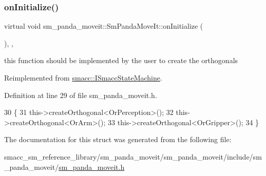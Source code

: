 \subsubsection{\texorpdfstring{on\+Initialize()}{onInitialize()}}
{\footnotesize\ttfamily virtual void sm\+\_\+panda\+\_\+moveit\+::\+Sm\+Panda\+Move\+It\+::on\+Initialize (\begin{DoxyParamCaption}{ }\end{DoxyParamCaption})\hspace{0.3cm}{\ttfamily [inline]}, {\ttfamily [override]}, {\ttfamily [virtual]}}



this function should be implemented by the user to create the orthogonals 



Reimplemented from \hyperlink{classsmacc_1_1ISmaccStateMachine_ac2982c6c8283663e5e1e8a7c82f511ec}{smacc\+::\+I\+Smacc\+State\+Machine}.



Definition at line 29 of file sm\+\_\+panda\+\_\+moveit.\+h.


\begin{DoxyCode}
30     \{
31         this->createOrthogonal<OrPerception>();
32         this->createOrthogonal<OrArm>();
33         this->createOrthogonal<OrGripper>();
34     \}
\end{DoxyCode}


The documentation for this struct was generated from the following file\+:\begin{DoxyCompactItemize}
\item 
smacc\+\_\+sm\+\_\+reference\+\_\+library/sm\+\_\+panda\+\_\+moveit/sm\+\_\+panda\+\_\+moveit/include/sm\+\_\+panda\+\_\+moveit/\hyperlink{sm__panda__moveit_8h}{sm\+\_\+panda\+\_\+moveit.\+h}\end{DoxyCompactItemize}
